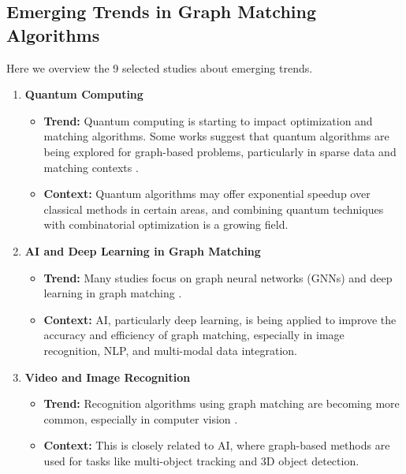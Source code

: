    \subsection{Emerging Trends in Graph Matching Algorithms}
        Here we overview the 9 selected studies about emerging trends.
        \begin{enumerate}
            \item \textbf{Quantum Computing}
            \begin{itemize}
                \item \textbf{Trend:} Quantum computing is starting to impact optimization and matching algorithms. Some works suggest that quantum algorithms are being explored for graph-based problems, particularly in sparse data and matching contexts \cite{quantum_matching}.
                \item \textbf{Context:} Quantum algorithms may offer exponential speedup over classical methods in certain areas, and combining quantum techniques with combinatorial optimization is a growing field.
            \end{itemize}
            
            \item \textbf{AI and Deep Learning in Graph Matching}
            \begin{itemize}
                \item \textbf{Trend:} Many studies focus on graph neural networks (GNNs) and deep learning in graph matching \cite{gnn_graph_matching, cross_modal_matching}.
                \item \textbf{Context:} AI, particularly deep learning, is being applied to improve the accuracy and efficiency of graph matching, especially in image recognition, NLP, and multi-modal data integration.
            \end{itemize}
        
            \item \textbf{Video and Image Recognition}
            \begin{itemize}
                \item \textbf{Trend:} Recognition algorithms using graph matching are becoming more common, especially in computer vision \cite{image_keypoint_matching}.
                \item \textbf{Context:} This is closely related to AI, where graph-based methods are used for tasks like multi-object tracking and 3D object detection.
            \end{itemize}
        

\end{enumerate}
